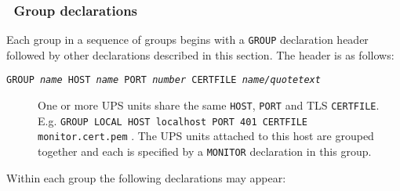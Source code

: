 \documentclass[12pt]{article}
\newlength{\headersep}\setlength{\headersep}{3mm}
\newcommand{\Hsep}{\hspace{\headersep}}
\begin{document}
\subsubsection{\Hsep\ Group declarations}\label{section:grpdecl}

Each group in a sequence of groups begins with a \texttt{GROUP} declaration
header followed by other declarations described in this section.  The header
is as follows:

\begin{description}

\item[\texttt{GROUP \textit{name} HOST \textit{name} PORT \textit{number}
    CERTFILE \textit{name/quotetext}}] \hspace{7mm} One or more UPS units
  share the same \texttt{HOST}, \texttt{PORT} and TLS \texttt{CERTFILE}.  E.g.
  \texttt{GROUP LOCAL HOST localhost PORT 401 CERTFILE monitor.cert.pem} . The
  UPS units attached to this host are grouped together and each is specified
  by a \texttt{MONITOR} declaration in this group.

\end{description}

Within each group the following declarations may appear:
\end{document}
